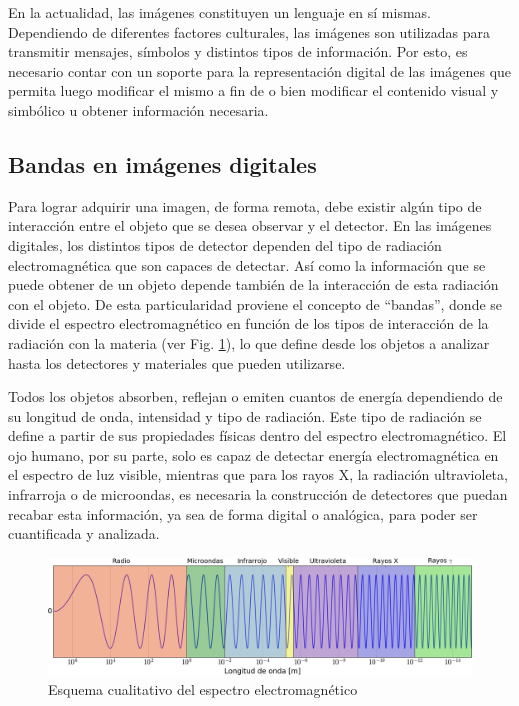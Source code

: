 En la actualidad, las imágenes constituyen un lenguaje en sí mismas. Dependiendo de diferentes factores culturales, las imágenes son utilizadas para transmitir mensajes, símbolos y distintos tipos de información. Por esto, es necesario contar con un soporte para la representación digital de las imágenes que permita luego modificar el mismo a fin de o bien modificar el contenido visual y simbólico u obtener información necesaria.

  \subsection{Bandas en imágenes digitales}

  Para lograr adquirir una imagen, de forma remota, debe existir algún tipo de interacción entre el objeto que se desea observar y el detector. En las imágenes digitales, los distintos tipos de detector dependen del tipo de radiación electromagnética que son capaces de detectar. Así como la información que se puede obtener de un objeto depende también de la interacción de esta radiación con el objeto. De esta particularidad proviene el concepto de ``bandas'', donde se divide el espectro electromagnético en función de los tipos de interacción de la radiación con la materia (ver Fig. \ref{fig2-1}), lo que define desde los objetos a analizar hasta los detectores y materiales que pueden utilizarse.

  Todos los objetos absorben, reflejan o emiten cuantos de energía dependiendo de su longitud de onda, intensidad y tipo de radiación. Este tipo de radiación se define a partir de sus propiedades físicas dentro del espectro electromagnético. El ojo humano, por su parte, solo es capaz de detectar energía electromagnética en el espectro de luz visible, mientras que para los rayos X, la radiación ultravioleta, infrarroja o de microondas, es necesaria la construcción de detectores que puedan recabar esta información, ya sea de forma digital o analógica, para poder ser cuantificada y analizada.

  \begin{figure}
   \centering
   \includegraphics[width=\textwidth]{figures/cap2/fig1_bandas/figure_1.png}
   \caption{Esquema cualitativo del espectro electromagnético}
   \label{fig2-1}
  \end{figure}

